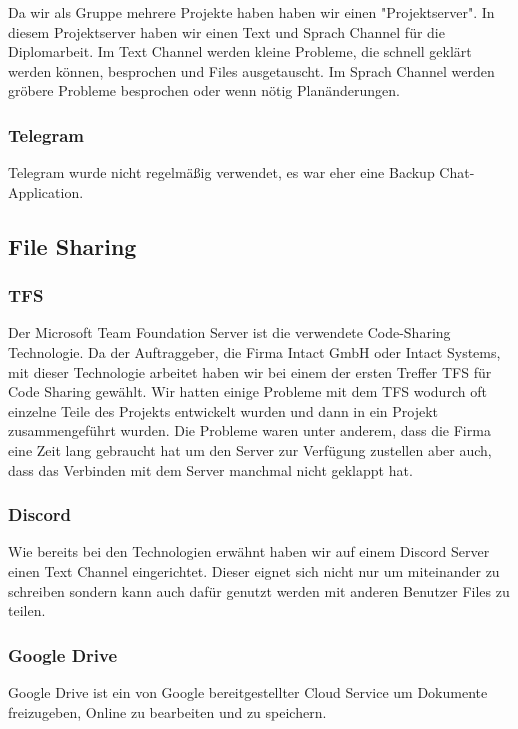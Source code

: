 Da wir als Gruppe mehrere Projekte haben haben wir einen "Projektserver". In diesem Projektserver haben wir einen Text und Sprach Channel für die Diplomarbeit. Im Text Channel werden kleine Probleme, die schnell geklärt werden können, besprochen und Files ausgetauscht. Im Sprach Channel werden gröbere Probleme besprochen oder wenn nötig Planänderungen. 


\subsubsection {Telegram}
\label{sec:Telegram}
Telegram wurde nicht regelmäßig verwendet, es war eher eine Backup Chat-Application. 

\subsection{File Sharing}
\label{sec:FileSharing}
\subsubsection {TFS}
\label{sec:TFS}
Der Microsoft Team Foundation Server ist die verwendete Code-Sharing Technologie. Da der Auftraggeber, die Firma Intact GmbH oder Intact Systems, mit dieser Technologie arbeitet haben wir bei einem der ersten Treffer TFS für Code Sharing gewählt. Wir hatten einige Probleme mit dem TFS wodurch oft einzelne Teile des Projekts entwickelt wurden und dann in ein Projekt zusammengeführt wurden. Die Probleme waren unter anderem, dass die Firma eine Zeit lang gebraucht hat um den Server zur Verfügung zustellen aber auch, dass das Verbinden mit dem Server manchmal nicht geklappt hat. 


\subsubsection {Discord}
\label{sec:Discord}
Wie bereits bei den Technologien erwähnt haben wir auf einem Discord Server einen Text Channel eingerichtet. Dieser eignet sich nicht nur um miteinander zu schreiben sondern kann auch dafür genutzt werden mit anderen Benutzer Files zu teilen. 
\subsubsection {Google Drive}
\label{sec:GoogleDrive}
Google Drive ist ein von Google bereitgestellter Cloud Service um Dokumente freizugeben, Online zu bearbeiten und zu speichern.


